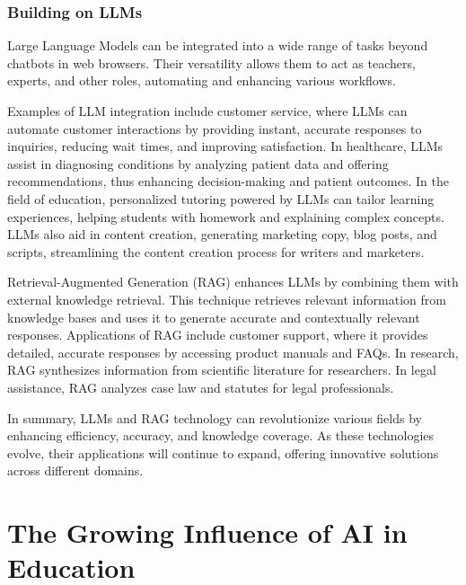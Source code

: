 \documentclass{article}
\begin{document}
\subsubsection{Building on LLMs}

Large Language Models can be integrated into a wide range of
tasks beyond chatbots in web browsers. Their versatility allows
them to act as teachers, experts, and other roles, automating
and enhancing various workflows.

Examples of LLM integration include customer service,
where LLMs can automate customer interactions by providing instant, accurate responses to inquiries,
reducing wait times, and improving satisfaction. In healthcare, LLMs assist
in diagnosing conditions by analyzing patient data and offering
recommendations, thus enhancing decision-making and patient outcomes.
In the field of education, personalized tutoring powered by LLMs
can tailor learning experiences, helping students
with homework and explaining complex concepts. LLMs also aid
in content creation, generating marketing copy, blog posts,
and scripts, streamlining the content creation process for
writers and marketers.

Retrieval-Augmented Generation (RAG) enhances LLMs by combining
them with external knowledge retrieval. This technique retrieves relevant
information from knowledge bases and uses it to generate accurate
and contextually relevant responses. Applications of RAG include
customer support, where it provides detailed, accurate responses
by accessing product manuals and FAQs. In research, RAG synthesizes
information from scientific literature for researchers.
In legal assistance, RAG analyzes case law and statutes
for legal professionals. \cite{gao2024retrievalaugmented}

In summary, LLMs and RAG technology can revolutionize various fields by enhancing efficiency, accuracy, and knowledge coverage. As these technologies evolve, their applications will continue to expand, offering innovative solutions across different domains.





\newpage
\section{The Growing Influence of AI in Education}
\end{document}
